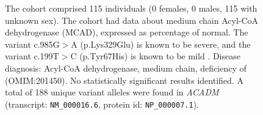 \begin{figure}[htbp]
    \vspace{2em}
    
    \caption{The cohort comprised 115 individuals (0 females, 0 males, 115 with unknown sex). The cohort had data about  medium chain Acyl-CoA dehydrogenase (MCAD), expressed as percentage of normal.
    The variant c.985G$>$A (p.Lys329Glu) is known to be severe, and the variant c.199T$>$C (p.Tyr67His) is known to be mild \cite{PMID_33580884}.
    Disease diagnosis: Acyl-CoA dehydrogenase, medium chain, deficiency of (OMIM:201450). No statistically significant results identified. A total of 188 unique variant alleles were found in \textit{ACADM} (transcript: \texttt{NM\_000016.6}, protein id: \texttt{NP\_000007.1}).}
    \end{figure}
    